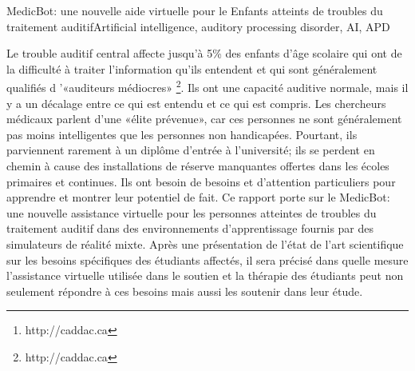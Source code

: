 \documentclass[letterpaper%
, twoside%
, 12pt%
,these%
, english%
,creativecommons,hyperref%
]{thETS}
\begin{document}
\begin{summary}{MedicBot: une nouvelle aide virtuelle pour le
		Enfants atteints de troubles du traitement auditif}{{Artificial intelligence, auditory processing disorder, AI, APD}}

Le trouble auditif central affecte jusqu'à 5\% des enfants d'âge scolaire qui ont de la difficulté à traiter l'information qu'ils entendent et qui sont généralement qualifiés d '«auditeurs médiocres» \footnote {http://caddac.ca}. Ils ont une capacité auditive normale, mais il y a un décalage entre ce qui est entendu et ce qui est compris. Les chercheurs médicaux parlent d'une «élite prévenue», car ces personnes ne sont généralement pas moins intelligentes que les personnes non handicapées. Pourtant, ils parviennent rarement à un diplôme d'entrée à l'université; ils se perdent en chemin à cause des installations de réserve manquantes offertes dans les écoles primaires et continues. Ils ont besoin de besoins et d'attention particuliers pour apprendre et montrer leur potentiel de fait. Ce rapport porte sur le MedicBot: une nouvelle assistance virtuelle pour les personnes atteintes de troubles du traitement auditif dans des environnements d'apprentissage fournis par des simulateurs de réalité mixte. Après une présentation de l'état de l'art scientifique sur les besoins spécifiques des étudiants affectés, il sera précisé dans quelle mesure l'assistance virtuelle utilisée dans le soutien et la thérapie des étudiants peut non seulement répondre à ces besoins mais aussi les soutenir dans leur étude.
\end{summary}


\begin{abstract}{{Artificial intelligence, auditory processing disorder, AI, APD}}

Central Auditory Processing Disorder affects up to 5\% of school-aged children who have difficulty processing the information they hear and are usually characterized as ``poor listeners”\footnote{http://caddac.ca}. They have normal hearing ability, but there is a disconnect between what is heard and what is understood. Medical researchers talk about a “forestalled elite” since these people are commonly not less intelligent than non-handicapped individuals. Still, they rarely make it to a university-entrance diploma; they get lost on the way because of missing standby facilities offered in primary and continuative schools. They require special needs and attention in order to learn and show their de facto potential. This report deals with the MedicBot: A new Virtual Assistance for the Auditory Processing Disorder people of learning environments provided by mixed-reality simulators. After a presentation of the scientific state of the art on the specific needs of affected students, it will be elaborated in how far virtual assistance used in the support and therapy of students can sufficiently not only meet those needs but support them in their study.
\end{abstract}
\end{document}
